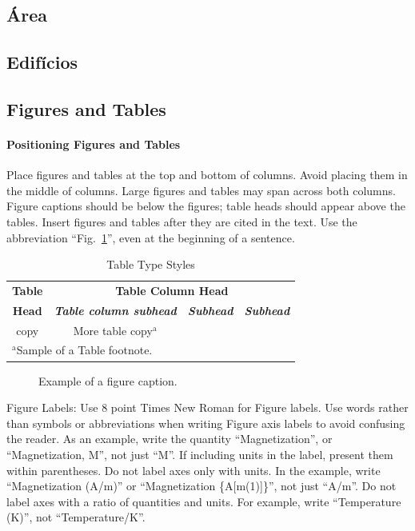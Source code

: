 \documentclass[conference]{IEEEtran}
\begin{document}
\subsection{Área}

\subsection{Edifícios}

\subsection{Figures and Tables}
\paragraph{Positioning Figures and Tables} Place figures and tables at the top and 
bottom of columns. Avoid placing them in the middle of columns. Large 
figures and tables may span across both columns. Figure captions should be 
below the figures; table heads should appear above the tables. Insert 
figures and tables after they are cited in the text. Use the abbreviation 
``Fig.~\ref{fig}'', even at the beginning of a sentence.

\begin{table}[htbp]
\caption{Table Type Styles}
\begin{center}
\begin{tabular}{|c|c|c|c|}
\hline
\textbf{Table}&\multicolumn{3}{|c|}{\textbf{Table Column Head}} \\
\cline{2-4} 
\textbf{Head} & \textbf{\textit{Table column subhead}}& \textbf{\textit{Subhead}}& \textbf{\textit{Subhead}} \\
\hline
copy& More table copy$^{\mathrm{a}}$& &  \\
\hline
\multicolumn{4}{l}{$^{\mathrm{a}}$Sample of a Table footnote.}
\end{tabular}
\label{tab1}
\end{center}
\end{table}

\begin{figure}[htbp]
\caption{Example of a figure caption.}
\label{fig}
\end{figure}

Figure Labels: Use 8 point Times New Roman for Figure labels. Use words 
rather than symbols or abbreviations when writing Figure axis labels to 
avoid confusing the reader. As an example, write the quantity 
``Magnetization'', or ``Magnetization, M'', not just ``M''. If including 
units in the label, present them within parentheses. Do not label axes only 
with units. In the example, write ``Magnetization (A/m)'' or ``Magnetization 
\{A[m(1)]\}'', not just ``A/m''. Do not label axes with a ratio of 
quantities and units. For example, write ``Temperature (K)'', not 
``Temperature/K''.
\end{document}
